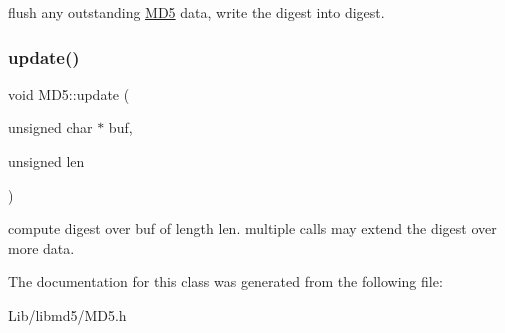flush any outstanding \hyperlink{class_m_d5}{M\+D5} data, write the digest into digest. \mbox{\label{class_m_d5_a52c7dbe8d4a57e8c79d4c905205e24d0}} 
\subsubsection{\texorpdfstring{update()}{update()}}
{\footnotesize\ttfamily void M\+D5\+::update (\begin{DoxyParamCaption}\item[{unsigned char $\ast$}]{buf,  }\item[{unsigned}]{len }\end{DoxyParamCaption})\hspace{0.3cm}{\ttfamily [inline]}}

compute digest over buf of length len. multiple calls may extend the digest over more data. 

The documentation for this class was generated from the following file\+:\begin{DoxyCompactItemize}
\item 
Lib/libmd5/M\+D5.\+h\end{DoxyCompactItemize}
